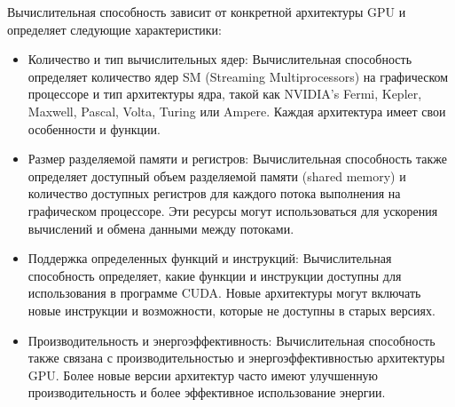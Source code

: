 \documentclass[a4paper, 12pt]{article}
\begin{document}
    Вычислительная способность зависит от конкретной архитектуры GPU и определяет следующие характеристики:
    \begin{itemize}
        \item Количество и тип вычислительных ядер: Вычислительная способность определяет количество ядер SM (Streaming Multiprocessors) на графическом процессоре и тип архитектуры ядра, такой как NVIDIA's Fermi, Kepler, Maxwell, Pascal, Volta, Turing или Ampere. Каждая архитектура имеет свои особенности и функции.
        \item Размер разделяемой памяти и регистров: Вычислительная способность также определяет доступный объем разделяемой памяти (shared memory) и количество доступных регистров для каждого потока выполнения на графическом процессоре. Эти ресурсы могут использоваться для ускорения вычислений и обмена данными между потоками.
        \item Поддержка определенных функций и инструкций: Вычислительная способность определяет, какие функции и инструкции доступны для использования в программе CUDA. Новые архитектуры могут включать новые инструкции и возможности, которые не доступны в старых версиях.
        \item Производительность и энергоэффективность: Вычислительная способность также связана с производительностью и энергоэффективностью архитектуры GPU. Более новые версии архитектур часто имеют улучшенную производительность и более эффективное использование энергии.
    \end{itemize}
    
\end{document}
